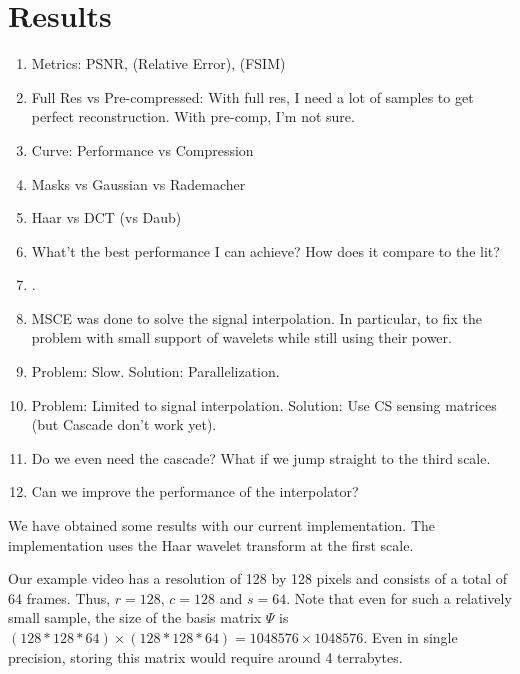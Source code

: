 \chapter{Results}
\begin{enumerate}
\item Metrics: PSNR, (Relative Error), (FSIM)
\item Full Res vs Pre-compressed: With full res, I need a lot of samples to get perfect reconstruction. With pre-comp, I'm not sure.
\item Curve: Performance vs Compression
\item Masks vs Gaussian vs Rademacher
\item Haar vs DCT (vs Daub)
\item What't the best performance I can achieve? How does it compare to the lit?
\item .
\item MSCE was done to solve the signal interpolation. In particular, to fix the problem with small support of wavelets while still using their power.
\item Problem: Slow. Solution: Parallelization.
\item Problem: Limited to signal interpolation. Solution: Use CS sensing matrices (but Cascade don't work yet).
\item Do we even need the cascade? What if we jump straight to the third scale.
\item Can we improve the performance of the interpolator? 
\end{enumerate}

We have obtained some results with our current implementation.
The implementation uses the Haar wavelet transform at the first scale.

Our example video has a resolution of 128 by 128 pixels and consists of a total of 64 frames.
Thus, $r = 128$, $c = 128$ and $s = 64$.
Note that even for such a relatively small sample, the size of the basis matrix $\Psi$ is $(128*128*64)\times(128*128*64) = 1048576\times 1048576$.
Even in single precision, storing this matrix would require around 4 terrabytes.

